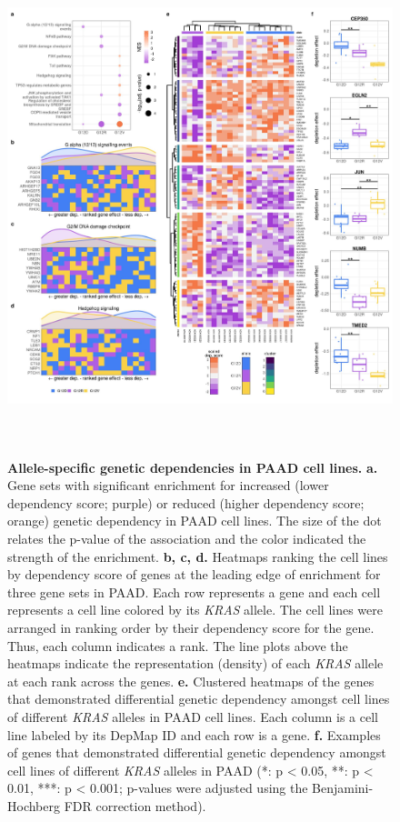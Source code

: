 \documentclass[english, 10pt, letterpaper]{article}
\newcommand{\KRAS}{\emph{KRAS}}
\begin{document}
\begin{figure}[p]
\centering
\includegraphics[height=145mm]{figures/SuppFigure_13.jpeg}
\caption{
    \textbf{Allele-specific genetic dependencies in PAAD cell lines.}
    \textbf{a.} Gene sets with significant enrichment for increased (lower dependency score; purple) or reduced (higher dependency score; orange) genetic dependency in PAAD cell lines. The size of the dot relates the p-value of the association and the color indicated the strength of the enrichment.
    \textbf{b, c, d.} Heatmaps ranking the cell lines by dependency score of genes at the leading edge of enrichment for three gene sets in PAAD. Each row represents a gene and each cell represents a cell line colored by its \KRAS{} allele. The cell lines were arranged in ranking order by their dependency score for the gene. Thus, each column indicates a rank. The line plots above the heatmaps indicate the representation (density) of each \KRAS{} allele at each rank across the genes.
    \textbf{e.} Clustered heatmaps of the genes that demonstrated differential genetic dependency amongst cell lines of different \KRAS{} alleles in PAAD cell lines. Each column is a cell line labeled by its DepMap ID and each row is a gene.
    \textbf{f.} Examples of genes that demonstrated differential genetic dependency amongst cell lines of different \KRAS{} alleles in PAAD (*: p < 0.05, **: p < 0.01, ***: p < 0.001; p-values were adjusted using the Benjamini-Hochberg FDR correction method).
}
\label{fig:paad-dependency-main}
\end{figure}
\end{document}
